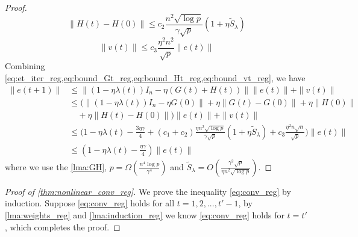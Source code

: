 \begin{proof}
\begin{equation}\label{eq:bound_Ht_reg}
    \|H(t)-H(0)\| \leq c_2\frac{n^2\sqrt{\log p}}{\gamma\sqrt p}(1+\eta \tilde{S}_\lambda)
\end{equation}
\begin{equation}\label{eq:bound_vt_reg}
    \|v(t)\| \leq c_3\frac{\eta^2n^2}{\sqrt p}\|e(t)\|
\end{equation}
Combining \cref{eq:et_iter_reg,eq:bound_Gt_reg,eq:bound_Ht_reg,eq:bound_vt_reg}, we have
\begin{equation*}
\begin{aligned}
\|e(t+1)\| 
&\leq \|(1-\eta\lambda(t))I_n-\eta (G(t)+H(t))\|\|e(t)\|+\|v(t)\| \\
&\leq \Big(\|(1-\eta\lambda(t))I_n-\eta G(0)\|+\eta\|G(t)-G(0)\|+\eta\|H(0)\| \\
&\quad +\eta\|H(t)-H(0)\|\Big)\|e(t)\| + \|v(t)\| \\
&\leq \Big( 1-\eta\lambda(t)-\frac{3\eta\gamma}{4}+(c_1+ c_2)\frac{\eta n^2\sqrt{\log p}}{\gamma\sqrt p}(1+\eta \tilde{S}_\lambda)+c_3\frac{\eta^2n\sqrt n}{\sqrt p}\Big)\|e(t)\|  \\
&\leq(1-\eta\lambda(t)-\frac{\eta\gamma}{4})\|e(t)\|
\end{aligned}
\end{equation*}
where we use the \cref{lma:GH}, $p=\Omega(\frac{n^4\log p}{\gamma^4})$ and $\tilde{S}_\lambda = O(\frac{\gamma^2\sqrt{p}}{\eta n^2\sqrt{\log p}})$.
\end{proof}

\begin{proof}[Proof of \cref{thm:nonlinear_conv_reg}]
We prove the inequality \eqref{eq:conv_reg} by induction. Suppose \eqref{eq:conv_reg} holds for all $t=1,2,...,t'-1$, by \cref{lma:weights_reg} and \cref{lma:induction_reg} we know \eqref{eq:conv_reg} holds for $t=t'$, which completes the proof.
\end{proof}
